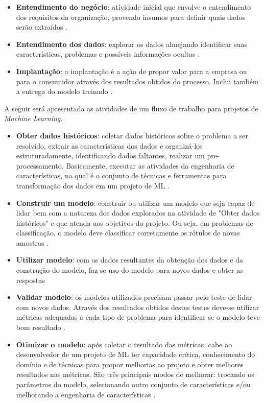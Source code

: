 \begin{itemize}
	\item \textbf{Entendimento do negócio}: atividade inicial que envolve o entendimento dos requisitos da organização, provendo insumos para definir quais dados serão extraídos \cite{CHAPMAN2000}. 
    \item \textbf{Entendimento dos dados}: explorar os dados almejando identificar suas características, problemas e possíveis informações ocultas \cite{CHAPMAN2000}.
    \item \textbf{Implantação}: a implantação é a ação de propor valor para a empresa ou para o consumidor através dos resultados obtidos do processo. Inclui também a entrega do modelo treinado \cite{CHAPMAN2000}.
\end{itemize}

A seguir será apresentada as atividades de um fluxo de trabalho para projetos de \textit{Machine Learning}.

\begin{itemize}
	\item \textbf{Obter dados históricos}: coletar dados históricos sobre o problema a ser resolvido, extrair as características dos dados e organizá-los estruturadamente, identificando dados faltantes, realizar um pre-processamento. Basicamente, executar as atividades da engenharia de características, na qual é o conjunto de técnicas e ferramentas para transformação dos dados em um projeto de ML \cite{BRINK2015}.
    \item \textbf{Construir um modelo}: construir ou utilizar um modelo que seja capaz de lidar bem com a natureza dos dados explorados na atividade de "Obter dados históricos" e que atenda aos objetivos do projeto. Ou seja, em problemas de classificação, o modelo deve classificar corretamente os rótulos de novas amostras \cite{BRINK2015}.
    \item \textbf{Utilizar modelo}: com os dados resultantes da obtenção dos dados e da construção do modelo, faz-se uso do modelo para novos dados e obter as respostas
    \item \textbf{Validar modelo}: os modelos utilizados precisam passar pelo teste de lidar com novos dados. Através dos resultados obtidos destes testes deve-se utilizar métricas adequadas a cada tipo de problema para identificar se o modelo teve bom resultado \cite{BRINK2015}.
    \item \textbf{Otimizar o modelo}: após coletar o resultado das métricas, cabe ao desenvolvedor de um projeto de ML ter capacidade crítica, conhecimento do domínio e de técnicas para propor melhorias ao projeto e obter melhores resultados nas métricas. São três principais modos de melhorar: trocando os parâmetros do modelo, selecionando outro conjunto de características e/ou melhorando a engenharia de características \cite{BRINK2015}.
\end{itemize}

